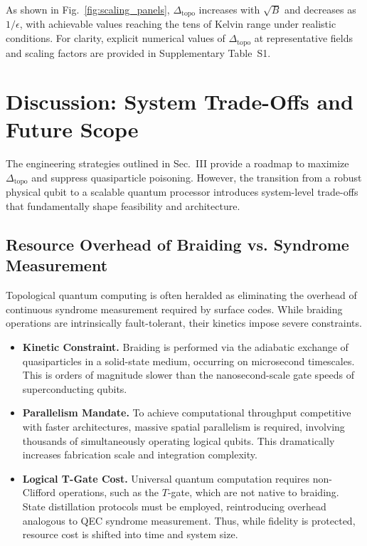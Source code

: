 \documentclass[aps,prl,twocolumn,superscriptaddress]{revtex4-2}
\begin{document}
As shown in Fig.~\ref{fig:scaling_panels}, $\Delta_{\text{topo}}$ increases with $\sqrt{B}$ and decreases as $1/\epsilon$, with achievable values reaching the tens of Kelvin range under realistic conditions. 
For clarity, explicit numerical values of $\Delta_{\text{topo}}$ at representative fields and scaling factors are provided in Supplementary Table~S1.


\section{Discussion: System Trade-Offs and Future Scope}

The engineering strategies outlined in Sec.~III provide a roadmap to maximize $\Delta_{\text{topo}}$ and suppress quasiparticle poisoning. However, the transition from a robust physical qubit to a scalable quantum processor introduces system-level trade-offs that fundamentally shape feasibility and architecture.

\subsection{Resource Overhead of Braiding vs. Syndrome Measurement}
Topological quantum computing is often heralded as eliminating the overhead of continuous syndrome measurement required by surface codes. While braiding operations are intrinsically fault-tolerant, their kinetics impose severe constraints.  
\begin{itemize}
    \item \textbf{Kinetic Constraint.} Braiding is performed via the adiabatic exchange of quasiparticles in a solid-state medium, occurring on microsecond timescales. This is orders of magnitude slower than the nanosecond-scale gate speeds of superconducting qubits.  
    \item \textbf{Parallelism Mandate.} To achieve computational throughput competitive with faster architectures, massive spatial parallelism is required, involving thousands of simultaneously operating logical qubits. This dramatically increases fabrication scale and integration complexity.  
    \item \textbf{Logical T-Gate Cost.} Universal quantum computation requires non-Clifford operations, such as the $T$-gate, which are not native to braiding. State distillation protocols must be employed, reintroducing overhead analogous to QEC syndrome measurement. Thus, while fidelity is protected, resource cost is shifted into time and system size.
\end{itemize}
\end{document}
